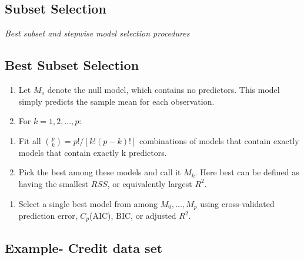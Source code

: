 \documentclass[
]{article}
\providecommand{\tightlist}{%
  \setlength{\itemsep}{0pt}\setlength{\parskip}{0pt}}
\begin{document}
\hypertarget{subset-selection}{%
\subsection{Subset Selection}\label{subset-selection}}

\emph{Best subset and stepwise model selection procedures}

\hypertarget{best-subset-selection}{%
\subsection{Best Subset Selection}\label{best-subset-selection}}

\begin{enumerate}
\def\labelenumi{\arabic{enumi}.}
\tightlist
\item
  Let \(M_o\) denote the null model, which contains no predictors. This
  model simply predicts the sample mean for each observation.
\item
  For \(k = 1, 2, ...,p\):
\end{enumerate}

\begin{enumerate}
\def\labelenumi{\alph{enumi}.}
\tightlist
\item
  Fit all \({p \choose k} = p!/\left[k!(p-k)!\right]\) combinations of
  models that contain exactly models that contain exactly k predictors.
\item
  Pick the best among these models and call it \(M_k\). Here best can be
  defined as having the smallest \(RSS\), or equivalently largest
  \(R^2\).
\end{enumerate}

\begin{enumerate}
\def\labelenumi{\arabic{enumi}.}
\setcounter{enumi}{2}
\tightlist
\item
  Select a single best model from among \(M_0,...,M_p\) using
  cross-validated prediction error, \(C_p\)(AIC), BIC, or adjusted
  \(R^2\).
\end{enumerate}

\hypertarget{example--credit-data-set}{%
\subsection{Example- Credit data set}\label{example--credit-data-set}}
\end{document}
